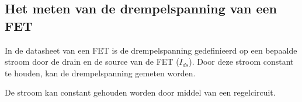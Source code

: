 \subsection{Het meten van de drempelspanning van een FET}

In de datasheet van een FET is de drempelspanning gedefinieerd op een bepaalde stroom door de drain en de source van de FET ($I_{ds}$).
Door deze stroom constant te houden, kan de drempelspanning gemeten worden.

De stroom kan constant gehouden worden door middel van een regelcircuit. 